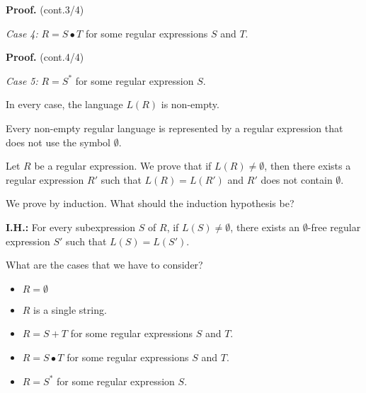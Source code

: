 \begin{frame}{}
  
  {\bf Proof.} (cont.3/4)

  {\em Case 4:} $R=S\bullet T$ for some regular expressions $S$ and $T$.

  \vspace{2.5in}
\end{frame}

\begin{frame}{}
  
  {\bf Proof.} (cont.4/4)

  {\em Case 5:} $R=S^*$ for some regular expression $S$.

  \vspace{2.5in}
  \pause

  In every case, the language $L(R)$ is non-empty.
\end{frame}


\begin{frame}
  \begin{lemma}
    Every non-empty regular language is represented by a regular
    expression that does not use the symbol $\emptyset$.
  \end{lemma}

  \pause

  Let $R$ be a regular expression. \pause We prove that if
  $L(R)\neq\emptyset$, then there exists a regular expression $R'$
  such that $L(R)=L(R')$ and $R'$ does not contain $\emptyset$.

  \pause We prove by induction.  What should the induction hypothesis
  be?

  \vspace{1.5in}
\end{frame}

\begin{frame}

  {\bf I.H.:} For every subexpression $S$ of $R$, if $L(S)\neq
  \emptyset$, there exists an $\emptyset$-free regular expression $S'$
  such that $L(S)=L(S')$.

  \vspace{0.1in}
  
  \pause

  \begin{block}{What are the cases that we have to consider?}

  \pause

  \begin{itemize}
  \item $R=\emptyset$
  \item $R$ is a single string.
  \item $R = S+T$ for some regular expressions $S$ and $T$.
  \item $R = S\bullet T$ for some regular expressions $S$ and $T$.
  \item $R = S^*$ for some regular expression $S$.
  \end{itemize}
  \end{block}
  
\end{frame}

